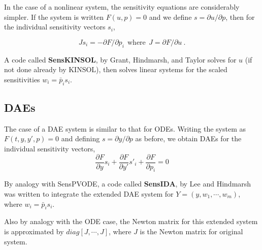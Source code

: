 In the case of a nonlinear system, the sensitivity equations are
considerably simpler.  If the system is written $F(u,p) = 0$ and we
define $s = \partial u / \partial p$, then for the individual
sensitivity vectors $s_i$,

\[ J s_i = -\partial F / \partial p_i ~~\mbox{where} ~~
          J = \partial F / \partial u ~. \]

A code called {\bf SensKINSOL}, by Grant, Hindmarsh, and Taylor
\cite{SensKIN} solves for $u$ (if not done already by KINSOL), then
solves linear systems for the scaled sensitivities $w_i = \bar{p}_i s_i$.


\subsection{DAEs}

The case of a DAE system is similar to that for ODEs.  Writing the
system as $F(t,y,y',p) = 0$ and defining $s = \partial y / \partial p$
as before, we obtain DAEs for the individual sensitivity vectors,
\[ \frac{\partial F}{\partial y} s_i + \frac{\partial F}{\partial y'} s'_i
                                 + \frac{\partial F}{\partial p_i}  = 0 \]

By analogy with SensPVODE, a code called {\bf SensIDA}, by Lee and
Hindmarsh was written to integrate the extended DAE system for
$Y = (y,w_1,\cdots,w_m)$, where $w_i = \bar{p}_i s_i$.

Also by analogy with the ODE case, the Newton matrix for this extended
system is approximated by $diag[J,\cdots,J]$, where $J$ is the Newton
matrix for original system.


